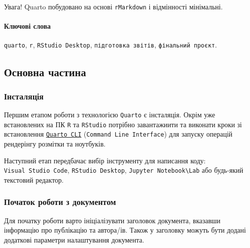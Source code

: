 \documentclass[
  letterpaper,
  DIV=11,
  numbers=noendperiod]{scrartcl}
\let\oldparagraph\paragraph
\renewcommand{\paragraph}[1]{\oldparagraph{#1}\mbox{}}
\begin{document}
Увага! Quarto побудовано на основі \texttt{rMarkdown} і відмінності
мінімальні.

\hypertarget{ux43aux43bux44eux447ux43eux432ux456-ux441ux43bux43eux432ux430}{%
\paragraph{Ключові
слова}\label{ux43aux43bux44eux447ux43eux432ux456-ux441ux43bux43eux432ux430}}

\texttt{quarto}, \texttt{r}, \texttt{RStudio\ Desktop},
\texttt{підготовка\ звітів}, \texttt{фінальний\ проєкт}.

\hypertarget{ux43eux441ux43dux43eux432ux43dux430-ux447ux430ux441ux442ux438ux43dux430}{%
\subsection{Основна
частина}\label{ux43eux441ux43dux43eux432ux43dux430-ux447ux430ux441ux442ux438ux43dux430}}

\hypertarget{ux456ux43dux441ux442ux430ux43bux44fux446ux456ux44f}{%
\subsubsection{Інсталяція}\label{ux456ux43dux441ux442ux430ux43bux44fux446ux456ux44f}}

Першим етапом роботи з технологією \texttt{Quarto} є інсталяція. Окрім
уже встановлених на ПК \texttt{R} та \texttt{RStudio} потрібно
завантажиити та виконати кроки зі встановлення
\href{https://quarto.org/docs/get-started/}{\texttt{Quarto\ CLI}}
(\texttt{Command\ Line\ Interface}) для запуску операцій рендерінгу
розмітки та ноутбуків.

Наступний етап передбачає вибір інструменту для написання коду:
\texttt{Visual\ Studio\ Code}, \texttt{RStudio\ Desktop},
\texttt{Jupyter\ Notebook\textbackslash{}Lab} або будь-який текстовий
редактор.

\hypertarget{ux43fux43eux447ux430ux442ux43eux43a-ux440ux43eux431ux43eux442ux438-ux437-ux434ux43eux43aux443ux43cux435ux43dux442ux43eux43c}{%
\subsubsection{Початок роботи з
документом}\label{ux43fux43eux447ux430ux442ux43eux43a-ux440ux43eux431ux43eux442ux438-ux437-ux434ux43eux43aux443ux43cux435ux43dux442ux43eux43c}}

Для початку роботи варто ініціалізувати заголовок документа, вказавши
інформацію про публікацію та автора/ів. Також у заголовку можуть бути
додані додаткові параметри налаштування документа.
\end{document}
